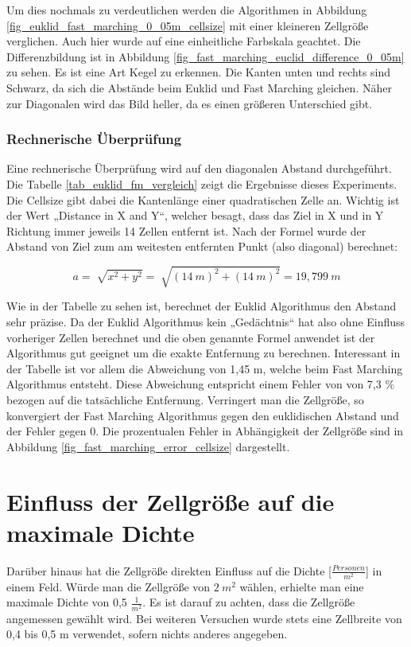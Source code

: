 Um dies nochmals zu verdeutlichen werden die Algorithmen in Abbildung \ref{fig_euklid_fast_marching_0_05m_cellsize} mit einer kleineren Zellgröße verglichen. Auch hier wurde auf eine einheitliche Farbskala geachtet. Die Differenzbildung ist in Abbildung \ref{fig_fast_marching_euclid_difference_0_05m} zu sehen. Es ist eine Art Kegel zu erkennen. Die Kanten unten und rechts sind Schwarz, da sich die Abstände beim Euklid und Fast Marching gleichen. Näher zur Diagonalen wird das Bild heller, da es einen größeren Unterschied gibt.

\subsubsection{Rechnerische Überprüfung}
Eine rechnerische Überprüfung wird auf den diagonalen Abstand durchgeführt. Die Tabelle \ref{tab_euklid_fm_vergleich} zeigt die Ergebnisse dieses Experiments. Die Cellsize gibt dabei die Kantenlänge einer quadratischen Zelle an. Wichtig ist der Wert „Distance in X and Y“, welcher besagt, dass das Ziel in X und in Y Richtung immer jeweils 14 Zellen entfernt ist.
Nach der Formel wurde der Abstand von Ziel zum am weitesten entfernten Punkt (also diagonal) berechnet:

$$a = \sqrt[]{x^2 +y^2} = \sqrt[]{(14\ m) ^2 +(14\ m) ^2} = 19,799\ m$$ 

Wie in der Tabelle zu sehen ist, berechnet der Euklid Algorithmus den Abstand sehr präzise. Da der Euklid Algorithmus kein „Gedächtnis“ hat also ohne Einfluss vorheriger Zellen berechnet und die oben genannte Formel anwendet ist der Algorithmus gut geeignet um die exakte Entfernung zu berechnen. Interessant in der Tabelle ist vor allem die Abweichung von 1,45 m, welche beim Fast Marching Algorithmus entsteht. Diese Abweichung entspricht einem Fehler von von 7,3 \% bezogen auf die tatsächliche Entfernung. Verringert man die Zellgröße, so konvergiert der Fast Marching Algorithmus gegen den euklidischen Abstand und der Fehler gegen 0. Die prozentualen Fehler in Abhängigkeit der Zellgröße sind in Abbildung \ref{fig_fast_marching_error_cellsize} dargestellt. 

\section{Einfluss der Zellgröße auf die maximale Dichte}
Darüber hinaus hat die Zellgröße direkten Einfluss auf die Dichte [$\frac{Personen}{m^2}$] in einem Feld. Würde man die Zellgröße von $2\ m^2$ wählen, erhielte man eine maximale Dichte von 0,5 $\frac{1}{m^2}$. Es ist darauf zu achten, dass die Zellgröße angemessen gewählt wird. Bei weiteren Versuchen wurde stets eine Zellbreite von 0,4 bis 0,5 m verwendet, sofern nichts anderes angegeben.



